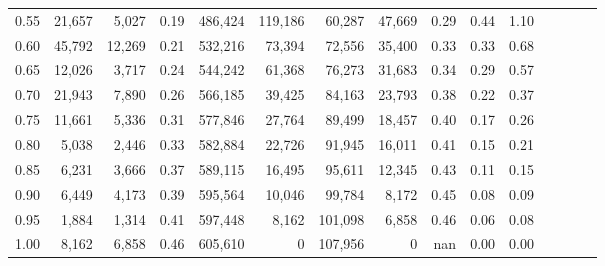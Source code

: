 \begin{tabular}{rrrcrrrrrrrrrrr}
0.55 &  21,657 &   5,027 &                                       0.19 &  486,424 &  119,186 &   60,287 &   47,669 &  0.29 &  0.44 &                         1.10 \\
0.60 &  45,792 &  12,269 &                                       0.21 &  532,216 &   73,394 &   72,556 &   35,400 &  0.33 &  0.33 &                         0.68 \\
0.65 &  12,026 &   3,717 &                                       0.24 &  544,242 &   61,368 &   76,273 &   31,683 &  0.34 &  0.29 &                         0.57 \\
0.70 &  21,943 &   7,890 &                                       0.26 &  566,185 &   39,425 &   84,163 &   23,793 &  0.38 &  0.22 &                         0.37 \\
0.75 &  11,661 &   5,336 &                                       0.31 &  577,846 &   27,764 &   89,499 &   18,457 &  0.40 &  0.17 &                         0.26 \\
0.80 &   5,038 &   2,446 &                                       0.33 &  582,884 &   22,726 &   91,945 &   16,011 &  0.41 &  0.15 &                         0.21 \\
0.85 &   6,231 &   3,666 &                                       0.37 &  589,115 &   16,495 &   95,611 &   12,345 &  0.43 &  0.11 &                         0.15 \\
0.90 &   6,449 &   4,173 &                                       0.39 &  595,564 &   10,046 &   99,784 &    8,172 &  0.45 &  0.08 &                         0.09 \\
0.95 &   1,884 &   1,314 &                                       0.41 &  597,448 &    8,162 &  101,098 &    6,858 &  0.46 &  0.06 &                         0.08 \\
1.00 &   8,162 &   6,858 &                                       0.46 &  605,610 &        0 &  107,956 &        0 &   nan &  0.00 &                         0.00 \\
\bottomrule
\end{tabular}
